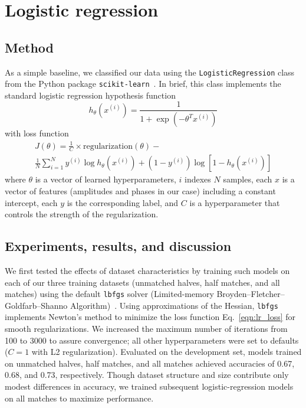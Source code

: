 \documentclass[nofootinbib,pre,superscriptaddress,twocolumn,longbibliography,floatfix]{revtex4-2}
\begin{document}
\section{Logistic regression}
\subsection{Method}
As a simple baseline, we classified our data using the \texttt{LogisticRegression}
class from the Python package \texttt{scikit-learn}~\cite{scikit-learn}.
In brief, this class implements the standard logistic regression hypothesis function
\begin{equation}
    h_\theta (x^{(i)}) = \frac{1}{1+\exp(-\theta^T x^{(i)})}
    \label{eqn:lr_hypothesis}
\end{equation}
with loss function
\begin{multline}
    J(\theta) = \frac{1}{C}\times\text{regularization}(\theta)-\\
    \frac{1}{N}\sum_{i=1}^N y^{(i)}\log h_\theta (x^{(i)})+(1-y^{(i)})\log [1-h_\theta (x^{(i)})]
    \label{eqn:lr_loss}
\end{multline}
where $\theta$ is a vector of learned hyperparameters,
$i$ indexes $N$ samples,
each $x$ is a vector of features (amplitudes and phases in our case) including a constant intercept,
each $y$ is the corresponding label,
and $C$ is a hyperparameter that controls the strength of the regularization.

\subsection{Experiments, results, and discussion}
We first tested the effects of dataset characteristics by training 
such models on each of our three training datasets
(unmatched halves, half matches, and all matches) using the default \texttt{lbfgs} solver (Limited-memory Broyden–Fletcher–Goldfarb–Shanno Algorithm)~\cite{lbfgs}.
Using approximations of the Hessian, \texttt{lbfgs} implements Newton's method to minimize
the loss function Eq.~\ref{eqn:lr_loss} for smooth regularizations.
We increased the maximum number of iterations from 100 to 3000 to assure convergence;
all other hyperparameters were set to defaults ($C=1$ with L2 regularization).
Evaluated on the development set, models trained on unmatched halves, half matches, and all matches
achieved accuracies of 0.67, 0.68, and 0.73, respectively.
Though dataset structure and size contribute only modest differences in accuracy,
we trained subsequent logistic-regression models on all matches to maximize performance.
\end{document}
